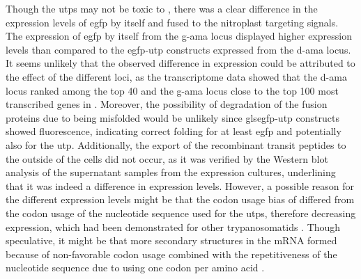 \par Though the \gls{utp}s may not be toxic to , there was a clear difference in the expression levels of \gls{egfp} by itself and fused to the nitroplast targeting signals. The expression of \gls{egfp} by itself from the \gls{g-ama} locus displayed higher expression levels than compared to the \gls{egfp}-\gls{utp} constructs expressed from the \gls{d-ama} locus. It seems unlikely that the observed difference in expression could be attributed to the effect of the different loci, as the transcriptome data showed that the \gls{d-ama} locus ranked among the top 40 and the \gls{g-ama} locus close to the top 100 most transcribed genes in  \parencite{morales_development_2016}. Moreover, the possibility of degradation of the fusion proteins due to being misfolded would be unlikely since gls{egfp}-\gls{utp} constructs showed fluorescence, indicating correct folding for at least \gls{egfp} and potentially also for the \gls{utp}. Additionally, the export of the recombinant transit peptides 
to the outside of the cells did not occur, as it was verified by the Western blot analysis of the supernatant samples from the expression cultures, underlining that it was indeed a difference in expression levels. However, a possible reason for the different expression levels might be that the codon usage bias of  differed from the codon usage of the nucleotide sequence used for the \gls{utp}s, therefore decreasing expression, which had been demonstrated for other trypanosomatids \parencite{de_freitas_nascimento_codon_2018, horn_codon_2008}. Though speculative, it might be that more secondary structures in the mRNA formed because of non-favorable codon usage combined with the repetitiveness of the nucleotide sequence due to using one codon per amino acid \parencite{subramanian_comparison_2015}.

